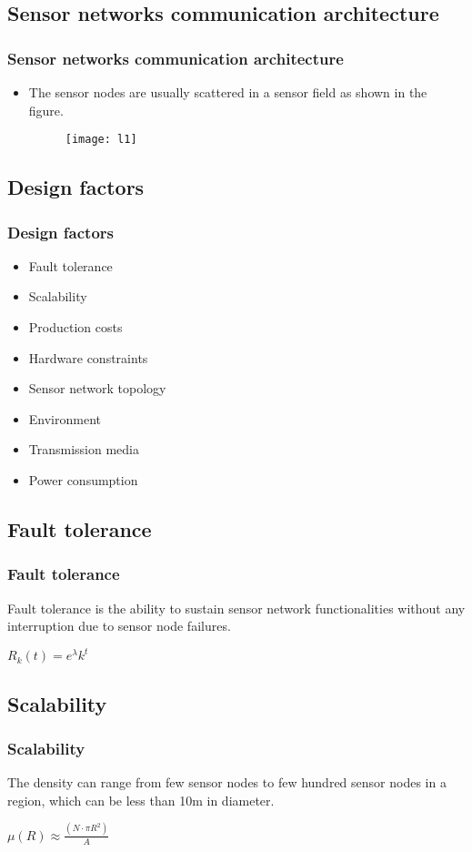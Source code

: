 \documentclass[xcolor=dvipsnames]{beamer}
\begin{document}
\subsection{Sensor networks communication architecture}
\begin{frame}
\frametitle{Sensor networks communication architecture}
\begin{itemize}
\item The sensor nodes are usually scattered in a sensor field as shown in the figure.
\begin{figure}
\begin{center}
  \texttt{[image: l1]}
\end{center}
\end{figure}
\end{itemize}
\end{frame}

\subsection{Design factors}
\begin{frame}
\frametitle{Design factors}
\begin{itemize}
\item<1-> Fault tolerance
\item<2-> Scalability
\item<3-> Production costs
\item<4-> Hardware constraints
\item<5-> Sensor network topology
\item<6-> Environment
\item<7-> Transmission media 
\item<8-> Power consumption
\end{itemize}
\end{frame}

\subsection{Fault tolerance}
\begin{frame}
\frametitle{Fault tolerance}
Fault tolerance is the ability to sustain sensor network functionalities without any interruption due to sensor node failures.
\begin{center}
$R_{k}(t)=e^{\lambda}k^{t}$
\end{center}
\end{frame}

\subsection{Scalability}
\begin{frame}
\frametitle{Scalability}
The density can range from few sensor nodes to few hundred sensor nodes in a region, which can be less than 10m in diameter.
\begin{center}
$\mu(R)\approx \frac{(N \cdot \pi R^{2})}{A}$
\end{center}
\end{frame}
\end{document}

